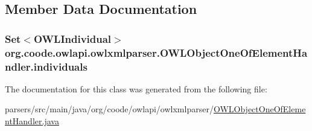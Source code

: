 \subsection{Member Data Documentation}
\hypertarget{classorg_1_1coode_1_1owlapi_1_1owlxmlparser_1_1_o_w_l_object_one_of_element_handler_a74eefdb5544bc39c205ee4e09d2f457a}{
\subsubsection[{individuals}]{\setlength{\rightskip}{0pt plus 5cm}Set$<${\bf O\-W\-L\-Individual}$>$ org.\-coode.\-owlapi.\-owlxmlparser.\-O\-W\-L\-Object\-One\-Of\-Element\-Handler.\-individuals\hspace{0.3cm}{\ttfamily [private]}}}\label{classorg_1_1coode_1_1owlapi_1_1owlxmlparser_1_1_o_w_l_object_one_of_element_handler_a74eefdb5544bc39c205ee4e09d2f457a}


The documentation for this class was generated from the following file\-:\begin{DoxyCompactItemize}
\item 
parsers/src/main/java/org/coode/owlapi/owlxmlparser/\hyperlink{_o_w_l_object_one_of_element_handler_8java}{O\-W\-L\-Object\-One\-Of\-Element\-Handler.\-java}\end{DoxyCompactItemize}

